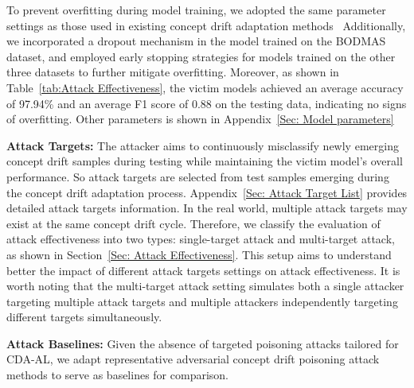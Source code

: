 To prevent overfitting during model training, we adopted the same parameter settings as those used in existing concept drift adaptation methods~\cite{2023-Usenix-chenyizhen}
Additionally, we incorporated a dropout mechanism in the model trained on the BODMAS dataset, and employed early stopping strategies for models trained on the other three datasets to further mitigate overfitting. 
Moreover, as shown in Table~\ref{tab:Attack Effectiveness}, the victim models achieved an average accuracy of 97.94\% and an average F1 score of 0.88 on the testing data, indicating no signs of overfitting.
Other parameters is shown in Appendix~\ref{Sec: Model parameters}

\textbf{Attack Targets:} 
The attacker aims to continuously misclassify newly emerging concept drift samples during testing while maintaining the victim model’s overall performance.
So attack targets are selected from test samples emerging during the concept drift adaptation process.
Appendix~\ref{Sec: Attack Target List} provides detailed attack targets information.
In the real world, multiple attack targets may exist at the same concept drift cycle.
Therefore, we classify the evaluation of attack effectiveness into two types: single-target attack and multi-target attack, as shown in Section~\ref{Sec: Attack Effectiveness}.
This setup aims to understand better the impact of different attack targets settings on attack effectiveness.
It is worth noting that the multi-target attack setting simulates both a single attacker targeting multiple attack targets and multiple attackers independently targeting different targets simultaneously.

\textbf{Attack Baselines:} Given the absence of targeted poisoning attacks tailored for CDA-AL, we adapt representative adversarial concept drift poisoning attack methods to serve as baselines for comparison.

